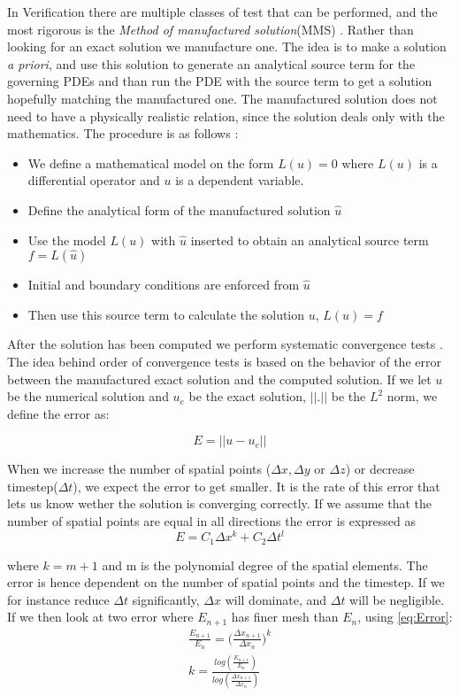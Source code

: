 In Verification there are multiple classes of test that can be performed, and the most rigorous is the \textit{Method of manufactured solution}(MMS) \cite{Oberkampf2010}. Rather than looking for an exact solution we manufacture one. The idea is to make a solution \textit{a priori},  and use this solution to generate an analytical source term for the governing PDEs and than run the PDE with the source term to get a solution hopefully matching the manufactured one. The manufactured solution does not need to have a physically realistic relation, since the solution deals only with the mathematics. 
The procedure is as follows \cite{Oberkampf2010}:
\begin{itemize}
\item We define a mathematical model on the form $ L(u) = 0$ where $L(u)$ is a differential operator and $u$ is a dependent variable.
\item Define the analytical form of the manufactured solution $\hat{u}$
\item Use the model $L(u)$ with $\hat{u}$ inserted to obtain an analytical source term $ f = L(\hat{u}) $
\item Initial and boundary conditions are enforced from $\hat{u}$
\item Then use this source term to calculate the solution $u$, $L(u) = f $
\end{itemize}

After the solution has been computed we perform systematic convergence tests \cite{Roache}. The idea behind order of convergence tests is based on the behavior of the error between the manufactured exact solution and the computed solution. 
If we let $u$ be the numerical solution and $ u_e $ be the exact solution, $|| . ||$ be the $L^2$ norm, we define the error as:

\begin{equation}
E = || u - u_e ||
\end{equation}

When we increase the number of spatial points ($ \Delta x, \Delta y$ or $ \Delta z$) or decrease timestep($\Delta t$), we expect the error to get smaller. It is the rate of this error that lets us know wether the solution is converging correctly.
If we assume that the number of spatial points are equal in all directions the error is expressed as
\begin{equation}
\label{eq:Error}
 E = C_1 \Delta x^k+ C_2 \Delta t^l 
\end{equation}

where $ k = m+1 $ and m is the polynomial degree of the spatial elements. The error is hence dependent on the number of spatial points and the timestep.
If we for instance reduce $\Delta t$ significantly, $\Delta x$ will dominate, and $\Delta t$ will be negligible. If we then look at two error where $E_{n+1}$ has finer mesh than $E_n$, using \eqref{eq:Error}:
\begin{align}
\frac{E_{n+1}}{E_n} = \big( \frac{\Delta x_{n+1}}{\Delta x_n} \big)^k \\
k = \frac{log( \frac{E_{n+1}}{E_n}) }{ log(\frac{\Delta x_{n+1}}{\Delta x_n})}
\end{align}

